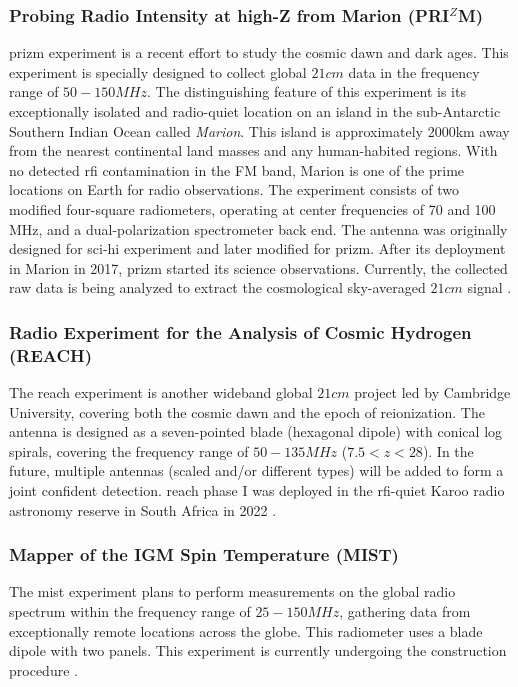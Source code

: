 \documentclass[12pt, TexShade, letterpaper]{report}
\begin{document}
\subsubsection{Probing Radio Intensity at high-Z from Marion (PRI$^Z$M)}
\gls{prizm} experiment is a recent effort to study the cosmic dawn and dark ages. This experiment is specially designed to collect global $21cm$ data in the frequency range of $50-150MHz$. The distinguishing feature of this experiment is its exceptionally isolated and radio-quiet location on an island in the sub-Antarctic Southern Indian Ocean called \emph{Marion}. This island is approximately 2000km away from the nearest continental land masses and any human-habited regions. With no detected \gls{rfi} contamination in the FM band, Marion is one of the prime locations on Earth for radio observations. The experiment consists of two modified four-square radiometers, operating at center frequencies of 70 and 100 MHz, and a dual-polarization spectrometer back end. The antenna was originally designed for \gls{sci-hi} experiment \cite{sci-hi_1, sci-hi_2} and later modified for \gls{prizm}. After its deployment in Marion in 2017, \gls{prizm} started its science observations. Currently, the collected raw data is being analyzed to extract the cosmological sky-averaged $21cm$ signal \cite{prizm_2017, prizm_thesis}.\par 

\subsubsection{Radio Experiment for the Analysis of Cosmic Hydrogen (REACH)}
The \gls{reach} experiment is another wideband global $21cm$ project led by Cambridge University, covering both the cosmic dawn and the epoch of reionization. The antenna is designed as a seven-pointed blade (hexagonal dipole) with conical log spirals, covering the frequency range of $50-135MHz$ ($7.5 < z < 28$). In the future, multiple antennas (scaled and/or different types) will be added to form a joint confident detection. \gls{reach} phase I was deployed in the \gls{rfi}-quiet Karoo radio astronomy reserve in South Africa in 2022 \cite{reach_z, reach, reach_design}. \par

\subsubsection{Mapper of the IGM Spin Temperature (MIST)}
The \gls{mist} experiment plans to perform measurements on the global radio spectrum within the frequency range of $25-150 MHz$, gathering data from exceptionally remote locations across the globe. This radiometer uses a blade dipole with two panels. This experiment is currently undergoing the construction procedure \cite{mist, mist_presentation, mist_website}.
\end{document}
